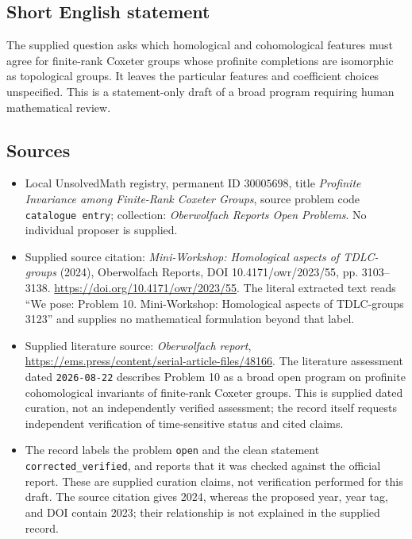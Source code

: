 \documentclass[11pt]{article}
\begin{document}
\subsection{Short English statement}
The supplied question asks which homological and cohomological features must agree for finite-rank Coxeter groups whose profinite completions are isomorphic as topological groups. It leaves the particular features and coefficient choices unspecified. This is a statement-only draft of a broad program requiring human mathematical review.
\subsection{Sources}
\begin{itemize}
\item Local UnsolvedMath registry, permanent ID \(30005698\), title \emph{Profinite Invariance among Finite-Rank Coxeter Groups}, source problem code \texttt{catalogue entry}; collection: \emph{Oberwolfach Reports Open Problems}. No individual proposer is supplied.
\item Supplied source citation: \emph{Mini-Workshop: Homological aspects of TDLC-groups} (2024), Oberwolfach Reports, DOI 10.4171/owr/2023/55, pp. 3103--3138. \url{https://doi.org/10.4171/owr/2023/55}. The literal extracted text reads ``We pose: Problem 10. Mini-Workshop: Homological aspects of TDLC-groups 3123'' and supplies no mathematical formulation beyond that label.
\item Supplied literature source: \emph{Oberwolfach report}, \url{https://ems.press/content/serial-article-files/48166}. The literature assessment dated \texttt{2026-08-22} describes Problem 10 as a broad open program on profinite cohomological invariants of finite-rank Coxeter groups. This is supplied dated curation, not an independently verified assessment; the record itself requests independent verification of time-sensitive status and cited claims.
\item The record labels the problem \texttt{open} and the clean statement \texttt{corrected\_verified}, and reports that it was checked against the official report. These are supplied curation claims, not verification performed for this draft. The source citation gives 2024, whereas the proposed year, year tag, and DOI contain 2023; their relationship is not explained in the supplied record.
\end{itemize}
\end{document}
